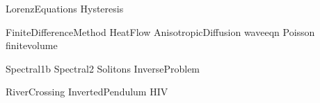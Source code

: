 \documentclass[nociteref]{SIAM-GH-book}
\begin{document}
{LorenzEquations}
{Hysteresis}

{FiniteDifferenceMethod}
{HeatFlow}
{AnisotropicDiffusion}
{waveeqn}
{Poisson}
{finitevolume}


{Spectral1b}
{Spectral2}
{Solitons}
{InverseProblem}

{RiverCrossing}
{InvertedPendulum}
{HIV}
\end{document}
